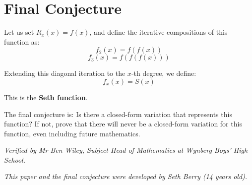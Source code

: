 \documentclass{article}
\begin{document}
\section{Final Conjecture}

Let us set $R_x(x) = f(x)$, and define the iterative compositions of this function as:
$$f_2(x) = f(f(x))$$
$$f_3(x) = f(f(f(x)))$$

Extending this diagonal iteration to the $x$-th degree, we define:
$$f_x(x) = S(x)$$

This is the \textbf{Seth function}. 

The final conjecture is: Is there a closed-form variation that represents this function? If not, prove that there will never be a closed-form variation for this function, even including future mathematics.

\vspace{1cm}

\begin{center}
\textit{Verified by Mr Ben Wiley, Subject Head of Mathematics at Wynberg Boys' High School.}

\vspace{0.3cm}

\textit{This paper and the final conjecture were developed by Seth Berry (14 years old).}
\end{center}
\end{document}
